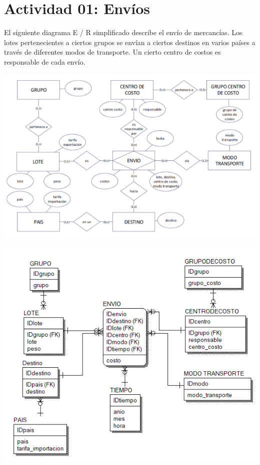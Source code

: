\section{Actividad 01: Envíos} 

El siguiente diagrama E / R simplificado describe el envío de mercancías. Los lotes pertenecientes a ciertos grupos se
envían a ciertos destinos en varios países a través de diferentes modos de transporte. Un cierto centro de costos es
responsable de cada envío.\\

	\begin{center}
	\includegraphics[width=15cm]{./Imagenes/img1}
	\end{center}	

	\begin{center}
	\includegraphics[width=15cm]{./Imagenes/img1-1}
	\end{center}	

